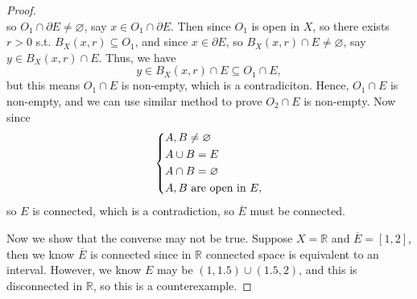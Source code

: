 \begin{proof}
\[    \] so \(O_1 \cap \partial E \neq \varnothing \), say \(x \in O_1 \cap \partial E\). Then since \(O_1\) is open in \(X\), so there exists \(r > 0\) s.t. \(B_X(x, r) \subseteq O_1\), and since \(x \in \partial E\), so \(B_X(x, r) \cap E \neq \varnothing \), say \(y \in B_X(x, r) \cap E\). Thus, we have
    \[
        y \in B_X(x, r) \cap E \subseteq O_1 \cap E,
    \] but this means \(O_1 \cap E\) is non-empty, which is a contradiciton. Hence, \(O_1 \cap E\) is non-empty, and we can use similar method to prove \(O_2 \cap E\) is non-empty. Now since 
    \[
        \begin{dcases}
            A, B \neq \varnothing \\
            A \cup B = E \\
            A \cap B = \varnothing \\
            A, B \text{ are open in } E,
        \end{dcases}
    \]   
    so \(E\) is connected, which is a contradiction, so \(\overline{E} \) must be connected. 
    
    Now we show that the converse may not be true. Suppose \(X = \mathbb{R} \) and \(\overline{E} = [1, 2] \), then we know \(\overline{E} \) is connected since in \(\mathbb{R} \) connected space is equivalent to an interval. However, we know \(E\) may be \((1, 1.5) \cup (1.5, 2)\), and this is disconnected in \(\mathbb{R} \), so this is a counterexample.        
    
\end{proof}

